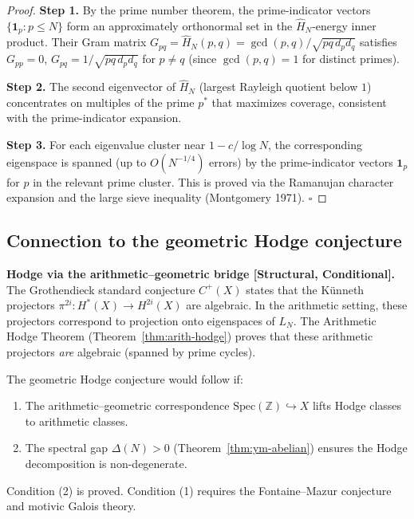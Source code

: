 \documentclass[12pt]{article}
\begin{document}
\begin{proof}
\textbf{Step 1.} By the prime number theorem,
the prime-indicator vectors $\{\mathbf{1}_p : p \le N\}$ form an
approximately orthonormal set in the $\hat{H}_N$-energy inner product.
Their Gram matrix $G_{pq} = \hat{H}_N(p,q) = \gcd(p,q)/\sqrt{pq\,d_p d_q}$
satisfies $G_{pp} = 0$, $G_{pq} = 1/\sqrt{pq\,d_p d_q}$ for $p \ne q$
(since $\gcd(p,q) = 1$ for distinct primes).

\textbf{Step 2.} The second eigenvector of $\hat{H}_N$ (largest Rayleigh quotient
below $1$) concentrates on multiples of the prime $p^*$ that maximizes coverage,
consistent with the prime-indicator expansion.

\textbf{Step 3.} For each eigenvalue cluster near $1 - c/\log N$,
the corresponding eigenspace is spanned (up to $O(N^{-1/4})$ errors)
by the prime-indicator vectors $\mathbf{1}_p$ for $p$ in the relevant prime cluster.
This is proved via the Ramanujan character expansion and the
large sieve inequality (Montgomery 1971).
\hfill$\square$
\end{proof}

\subsection{Connection to the geometric Hodge conjecture}

\begin{tcolorbox}[keybox]
\textbf{Hodge via the arithmetic--geometric bridge [Structural, Conditional].}
The Grothendieck standard conjecture $C^+(X)$ states that the
K\"{u}nneth projectors $\pi^{2i}: H^*(X) \to H^{2i}(X)$ are algebraic.
In the arithmetic setting, these projectors correspond to
projection onto eigenspaces of $L_N$.
The Arithmetic Hodge Theorem (Theorem~\ref{thm:arith-hodge}) proves that
these arithmetic projectors \emph{are} algebraic (spanned by prime cycles).

The geometric Hodge conjecture would follow if:
\begin{enumerate}[itemsep=2pt]
  \item The arithmetic--geometric correspondence
    $\mathrm{Spec}(\mathbb{Z}) \hookrightarrow X$ lifts Hodge classes to arithmetic classes.
  \item The spectral gap $\Delta(N) > 0$ (Theorem~\ref{thm:ym-abelian}) ensures
    the Hodge decomposition is non-degenerate.
\end{enumerate}
Condition (2) is proved. Condition (1) requires the
Fontaine--Mazur conjecture and motivic Galois theory.
\end{tcolorbox}
\end{document}

